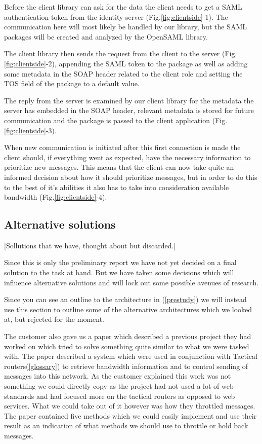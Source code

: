 \documentclass[12pt]{article}
\begin{document}
        Before the client library can ask for the data the client needs to get a SAML authentication token from the identity server (Fig.\ref{fig:clientside}-1). The communication here will most likely be handled by our library, but the SAML packages will be created and analyzed by the OpenSAML library. 

        The client library then sends the request from the client to the server (Fig.\ref{fig:clientside}-2), appending the SAML token to the package as well as adding some metadata in the SOAP header related to the client role and setting the TOS field of the package to a default value.

        The reply from the server is examined by our client library for the metadata the server has embedded in the SOAP header, relevant metadata is stored for future communication and the package is passed to the client application (Fig.\ref{fig:clientside}-3).

        When new communication is initiated after this first connection is made the client should, if everything went as expected, have the necessary information to prioritize new messages. This means that the client can now take quite an informed decision about how it should prioritize messages, but in order to do this to the best of it’s abilities it also has to take into consideration available bandwidth (Fig.\ref{fig:clientside}-4).
    
           
    \subsection{Alternative solutions}\label{alternativesolutions} [Sollutions that we have, thought about but discarded.]
    
        Since this is only the preliminary report we have not yet decided on a final solution to the task at hand. But we have taken some decisions which will influence alternative solutions and will lock out some possible avenues of research.

        Since you can see an outline to the architecture in (\ref{prestudy}) we will instead use this section to outline some of the alternative architectures which we looked at, but rejected for the moment.

        The customer also gave us a paper\cite{soa-qos-pdf} which described a previous project they had worked on which tried to solve something quite similar to what we were tasked with. The paper described a system which were used in conjunction with Tactical routers(\ref{glossary}) to retrieve bandwidth information and to control sending of messages into this network. As the customer explained this work was not something we could directly copy as the project had not used a lot of web standards and had focused more on the tactical routers as opposed to web services. What we could take out of it however was how they throttled messages. The paper contained five methods which we could easily implement and use their result as an indication of what methods we should use to throttle or hold back messages.
\end{document}
